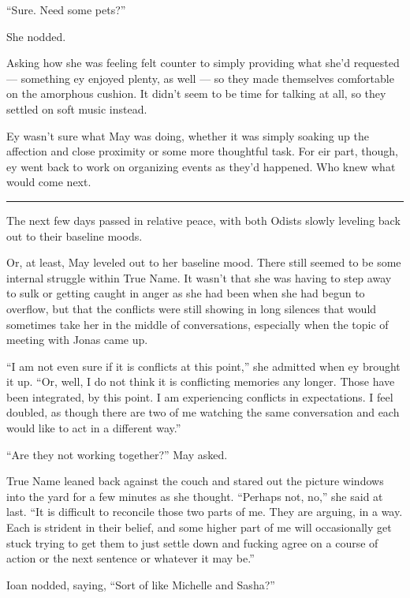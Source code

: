 ``Sure. Need some pets?''

She nodded.

Asking how she was feeling felt counter to simply providing what she'd requested — something ey enjoyed plenty, as well — so they made themselves comfortable on the amorphous cushion. It didn't seem to be time for talking at all, so they settled on soft music instead.

Ey wasn't sure what May was doing, whether it was simply soaking up the affection and close proximity or some more thoughtful task. For eir part, though, ey went back to work on organizing events as they'd happened. Who knew what would come next.

\begin{center}\rule{0.5\linewidth}{0.5pt}\end{center}

The next few days passed in relative peace, with both Odists slowly leveling back out to their baseline moods.

Or, at least, May leveled out to her baseline mood. There still seemed to be some internal struggle within True Name. It wasn't that she was having to step away to sulk or getting caught in anger as she had been when she had begun to overflow, but that the conflicts were still showing in long silences that would sometimes take her in the middle of conversations, especially when the topic of meeting with Jonas came up.

``I am not even sure if it is conflicts at this point,'' she admitted when ey brought it up. ``Or, well, I do not think it is conflicting memories any longer. Those have been integrated, by this point. I am experiencing conflicts in expectations. I feel doubled, as though there are two of me watching the same conversation and each would like to act in a different way.''

``Are they not working together?'' May asked.

True Name leaned back against the couch and stared out the picture windows into the yard for a few minutes as she thought. ``Perhaps not, no,'' she said at last. ``It is difficult to reconcile those two parts of me. They are arguing, in a way. Each is strident in their belief, and some higher part of me will occasionally get stuck trying to get them to just settle down and fucking agree on a course of action or the next sentence or whatever it may be.''

Ioan nodded, saying, ``Sort of like Michelle and Sasha?''

